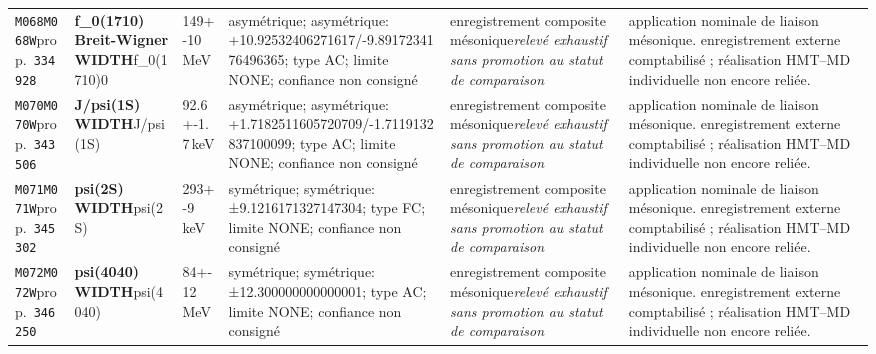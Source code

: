 \begin{landscape}
\begin{longtable}{L{1.85cm}L{4.45cm}L{2.35cm}L{4.05cm}L{3.35cm}L{7.15cm}}
\texttt{M068}\newline \texttt{M068W}\newline prop.\ \texttt{334928} & \textbf{f\_\allowbreak{}0(1710) Breit-Wigner WIDTH}\newline f\_\allowbreak{}0(1710)0 & 149+-10\,MeV & asymétrique; asymétrique: +10.92532406271617/-9.8917234176496365; type AC; limite NONE; confiance non consigné & enregistrement composite mésonique\newline \emph{relevé exhaustif sans promotion au statut de comparaison} & application nominale de liaison mésonique. enregistrement externe comptabilisé ; réalisation HMT--MD individuelle non encore reliée. \\
\texttt{M070}\newline \texttt{M070W}\newline prop.\ \texttt{343506} & \textbf{J/psi(1S) WIDTH}\newline J/psi(1S) & 92.6+-1.7\,keV & asymétrique; asymétrique: +1.7182511605720709/-1.7119132837100099; type AC; limite NONE; confiance non consigné & enregistrement composite mésonique\newline \emph{relevé exhaustif sans promotion au statut de comparaison} & application nominale de liaison mésonique. enregistrement externe comptabilisé ; réalisation HMT--MD individuelle non encore reliée. \\
\texttt{M071}\newline \texttt{M071W}\newline prop.\ \texttt{345302} & \textbf{psi(2S) WIDTH}\newline psi(2S) & 293+-9\,keV & symétrique; symétrique: ±9.1216171327147304; type FC; limite NONE; confiance non consigné & enregistrement composite mésonique\newline \emph{relevé exhaustif sans promotion au statut de comparaison} & application nominale de liaison mésonique. enregistrement externe comptabilisé ; réalisation HMT--MD individuelle non encore reliée. \\
\texttt{M072}\newline \texttt{M072W}\newline prop.\ \texttt{346250} & \textbf{psi(4040) WIDTH}\newline psi(4040) & 84+-12\,MeV & symétrique; symétrique: ±12.300000000000001; type AC; limite NONE; confiance non consigné & enregistrement composite mésonique\newline \emph{relevé exhaustif sans promotion au statut de comparaison} & application nominale de liaison mésonique. enregistrement externe comptabilisé ; réalisation HMT--MD individuelle non encore reliée. \\

\end{longtable}
\end{landscape}
